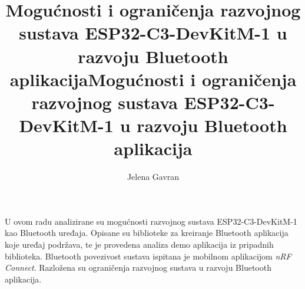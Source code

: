 \documentclass[times, utf8, seminar, numeric]{fer}
\begin{document}
\title{Mogućnosti i ograničenja razvojnog sustava ESP32-C3-DevKitM-1 u razvoju Bluetooth aplikacija}

\author{Jelena Gavran}


\maketitle

\tableofcontents

\begingroup
\renewcommand*\listfigurename{Popis slika}
\listoffigures
\endgroup












\title{Mogućnosti i ograničenja razvojnog sustava ESP32-C3-DevKitM-1 u razvoju Bluetooth aplikacija}
\begin{sazetak}
	U ovom radu analizirane su mogućnosti razvojnog sustava ESP32-C3-DevKitM-1 kao Bluetooth uređaja. Opisane su biblioteke za kreiranje Bluetooth aplikacija koje uređaj podržava, te je provedena analiza demo aplikacija iz pripadnih biblioteka. Bluetooth povezivost sustava ispitana je mobilnom aplikacijom \textit{nRF Connect}. Razložena su ograničenja razvojnog sustava u razvoju Bluetooth aplikacija.
	
\end{sazetak}
\end{document}
